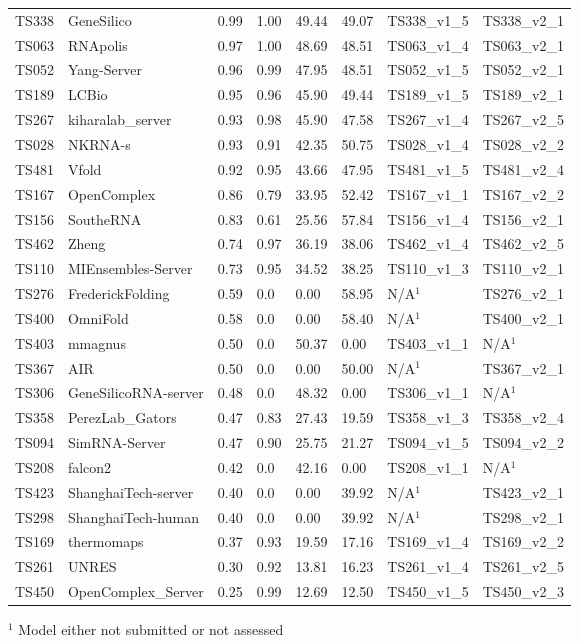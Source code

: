 \begin{table}[ht]
{\begin{tabular}{llllllll}
TS338 & GeneSilico & 0.99 & 1.00 & 49.44 & 49.07 & TS338\_v1\_5 & TS338\_v2\_1 \\ 
TS063 & RNApolis & 0.97 & 1.00 & 48.69 & 48.51 & TS063\_v1\_4 & TS063\_v2\_1 \\ 
TS052 & Yang-Server & 0.96 & 0.99 & 47.95 & 48.51 & TS052\_v1\_5 & TS052\_v2\_1 \\ 
TS189 & LCBio & 0.95 & 0.96 & 45.90 & 49.44 & TS189\_v1\_5 & TS189\_v2\_1 \\ 
TS267 & kiharalab\_server & 0.93 & 0.98 & 45.90 & 47.58 & TS267\_v1\_4 & TS267\_v2\_5 \\ 
TS028 & NKRNA-s & 0.93 & 0.91 & 42.35 & 50.75 & TS028\_v1\_4 & TS028\_v2\_2 \\ 
TS481 & Vfold & 0.92 & 0.95 & 43.66 & 47.95 & TS481\_v1\_5 & TS481\_v2\_4 \\ 
TS167 & OpenComplex & 0.86 & 0.79 & 33.95 & 52.42 & TS167\_v1\_1 & TS167\_v2\_2 \\ 
TS156 & SoutheRNA & 0.83 & 0.61 & 25.56 & 57.84 & TS156\_v1\_4 & TS156\_v2\_1 \\ 
TS462 & Zheng & 0.74 & 0.97 & 36.19 & 38.06 & TS462\_v1\_4 & TS462\_v2\_5 \\ 
TS110 & MIEnsembles-Server & 0.73 & 0.95 & 34.52 & 38.25 & TS110\_v1\_3 & TS110\_v2\_1 \\ 
TS276 & FrederickFolding & 0.59 & 0.0 & 0.00 & 58.95 & N/A$^{1}$ & TS276\_v2\_1 \\ 
TS400 & OmniFold & 0.58 & 0.0 & 0.00 & 58.40 & N/A$^{1}$ & TS400\_v2\_1 \\ 
TS403 & mmagnus & 0.50 & 0.0 & 50.37 & 0.00 & TS403\_v1\_1 & N/A$^{1}$ \\ 
TS367 & AIR & 0.50 & 0.0 & 0.00 & 50.00 & N/A$^{1}$ & TS367\_v2\_1 \\ 
TS306 & GeneSilicoRNA-server & 0.48 & 0.0 & 48.32 & 0.00 & TS306\_v1\_1 & N/A$^{1}$ \\ 
TS358 & PerezLab\_Gators & 0.47 & 0.83 & 27.43 & 19.59 & TS358\_v1\_3 & TS358\_v2\_4 \\ 
TS094 & SimRNA-Server & 0.47 & 0.90 & 25.75 & 21.27 & TS094\_v1\_5 & TS094\_v2\_2 \\ 
TS208 & falcon2 & 0.42 & 0.0 & 42.16 & 0.00 & TS208\_v1\_1 & N/A$^{1}$ \\ 
TS423 & ShanghaiTech-server & 0.40 & 0.0 & 0.00 & 39.92 & N/A$^{1}$ & TS423\_v2\_1 \\ 
TS298 & ShanghaiTech-human & 0.40 & 0.0 & 0.00 & 39.92 & N/A$^{1}$ & TS298\_v2\_1 \\ 
TS169 & thermomaps & 0.37 & 0.93 & 19.59 & 17.16 & TS169\_v1\_4 & TS169\_v2\_2 \\ 
TS261 & UNRES & 0.30 & 0.92 & 13.81 & 16.23 & TS261\_v1\_4 & TS261\_v2\_5 \\ 
TS450 & OpenComplex\_Server & 0.25 & 0.99 & 12.69 & 12.50 & TS450\_v1\_5 & TS450\_v2\_3 \\ 
\bottomrule
\end{tabular}%
}
\begin{flushleft}\footnotesize $^{1}$ Model either not submitted or not assessed\end{flushleft}
\end{table}
